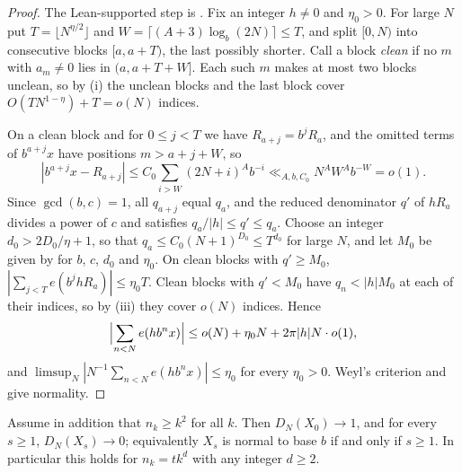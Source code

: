 \documentclass[11pt]{article}
\begin{document}
\begin{proof}
The Lean-supported step is . Fix an integer $h\ne0$ and $\eta_0>0$. For large $N$ put
$T=\lfloor N^{\eta/2}\rfloor$ and $W=\lceil(A+3)\log_b(2N)\rceil\le T$, and split $[0,N)$ into consecutive
blocks $[a,a+T)$, the last possibly shorter. Call a block \emph{clean} if no $m$ with $a_m\ne0$ lies in
$(a,a+T+W]$. Each such $m$ makes at most two blocks unclean, so by (i) the unclean blocks and the last
block cover $O(TN^{1-\eta})+T=o(N)$ indices.

On a clean block and for $0\le j<T$ we have $R_{a+j}=b^jR_a$, and the omitted terms of $b^{a+j}x$ have
positions $m>a+j+W$, so
\[
|b^{a+j}x-R_{a+j}|\le C_0\sum_{i>W}(2N+i)^Ab^{-i}\ll_{A,b,C_0}N^AW^Ab^{-W}=o(1).
\]
Since $\gcd(b,c)=1$, all $q_{a+j}$ equal $q_a$, and the reduced denominator $q'$ of $hR_a$ divides a power
of $c$ and satisfies $q_a/|h|\le q'\le q_a$. Choose an integer $d_0>2D_0/\eta+1$, so that
$q_a\le C_0(N+1)^{D_0}\le T^{d_0}$ for large $N$, and let $M_0$ be given by  for $b$, $c$,
$d_0$ and $\eta_0$. On clean blocks with $q'\ge M_0$, $|\sum_{j<T}e(b^jhR_a)|\le\eta_0T$. Clean blocks with
$q'<M_0$ have $q_n<|h|M_0$ at each of their indices, so by (iii) they cover $o(N)$ indices. Hence
\[
\Bigl|\sum_{n<N}e(hb^nx)\Bigr|\le o(N)+\eta_0N+2\pi|h|N\cdot o(1),
\]
and $\limsup_N|N^{-1}\sum_{n<N}e(hb^nx)|\le\eta_0$ for every $\eta_0>0$. Weyl's criterion
\cite[Chapter~1, Theorem~2.1, p.~7]{KN} and \cite[Chapter~1, Theorem~8.1, p.~70]{KN} give normality.
\end{proof}

\begin{theorem}\label{thm:switch}
Assume in addition that $n_k\ge k^2$ for all $k$. Then $D_N(X_0)\to1$, and for every $s\ge1$,
$D_N(X_s)\to0$; equivalently $X_s$ is normal to base $b$ if and only if $s\ge1$. In particular this
holds for $n_k=tk^d$ with any integer $d\ge2$.
\end{theorem}
\end{document}

